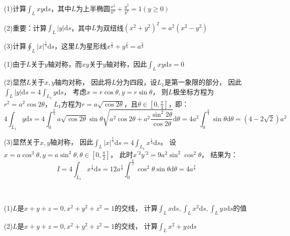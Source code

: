 \begin{exercise}[镜面对称性]
  (1)计算$\int_Lxy \mathrm{d} s$，其中$L$为上半椭圆$\frac{x^2}{a^2} + \frac{y^2}{b^2} = 1( y \geq 0)$

  (2)重要：计算$\int_L |y|\mathrm{d} s$，其中$L$为双纽线$(x^2 + y^2)^2 = a^2(x^2 - y^2)$

  (3)计算$\oint_L |x|^{\frac{1}{3}} \mathrm{d} s$，这里$L$为星形线$x^{\frac{2}{3}} + y^{\frac{2}{3}} = a^{\frac{2}{3}}$
\end{exercise}

\begin{solution}
  (1)由于$L$关于$y$轴对称，而$xy$关于$y$轴对称，因此$\int_L xy\mathrm{d} s = 0$

  (2)显然$L$关于$x,y$轴均对称，
  因此将$L$分为四段，设$L_1$是第一象限的部分，
  因此$\int_L |y|\mathrm{d} s = 4 \int_{L_1}y \mathrm{d} s$，
  考虑$x = r \cos \theta, y = r \sin \theta$，
  则$L$极坐标方程为$r^2 = a^2 \cos 2\theta$，
  $L_1$方程为$r = a \sqrt{\cos 2\theta}$，且$\theta \in [0, \frac{\pi}{4}]$，即：
  \begin{equation*}
    4\int_{L_1}y\mathrm{d} s = 4 \int_0^{\frac{\pi}{4}} a \sqrt{\cos 2\theta} \sin \theta \sqrt{a^2 \cos 2\theta + a^2 \frac{\sin^2 2\theta}{\cos 2\theta}} \mathrm{d} \theta = 4 a^2 \int_0^{\frac{\pi}{4}} \sin \theta \mathrm{d} \theta = (4 - 2 \sqrt{2})a^2
  \end{equation*}

  (3)显然关于$x,y$轴对称，
  因此$\int_L|x|^{\frac{1}{3}}\mathrm{d} s = 4 \int_{L_1}x^{\frac{1}{3}}\mathrm{d} s$。
  设$x = a\cos ^3\theta, y = a \sin^3\theta, \theta \in [0,\frac{\pi}{2}]$，
  此时$x^{\prime 2}y^{\prime 2} = 9a^2 \sin^2 \cos^2 \theta$，
  结果为：
  \begin{equation*}
    I = 4\int_{L_1}x^{\frac{1}{3}} \mathrm{d} s = 12a^{\frac{4}{3}}\int_0^{\frac{\pi}{2}} \cos^2\theta \sin \theta \mathrm{d} \theta = 4a^{\frac{4}{3}}
  \end{equation*}
\end{solution}

~

\begin{exercise}[轮换对称性]
  (1)$L$是$x+y+z = 0, x^2 + y^2 + z^2 = 1$的交线，
  计算$\int_Lx \mathrm{d} s, \int_Lx^2 \mathrm{d} s, \int_Lyz \mathrm{d} s$的值

  (2)$L$是$x+y+z = 0, x^2 + y^2 + z^2 = 1$的交线，
  计算$\int_L x^2 + yz\mathrm{d} s$
\end{exercise}

